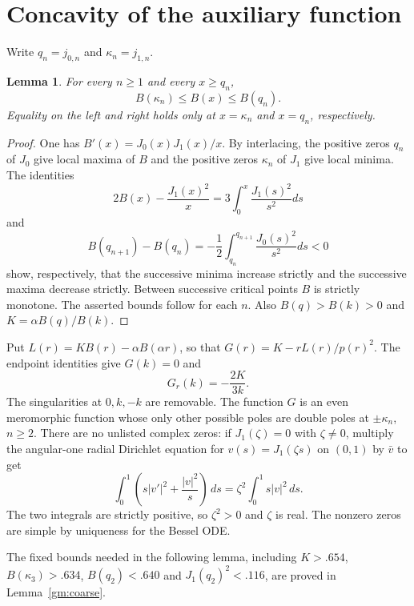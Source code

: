 \documentclass[11pt,letterpaper,reqno]{amsart}
\newtheorem{lemma}[theorem]{Lemma}
\theoremstyle{definition}
\begin{document}
\section{Concavity of the auxiliary function}\label{sec:G}
Write $q_n=j_{0,n}$ and $\kappa_n=j_{1,n}$.
\begin{lemma}\label{ev:Benvelope}
For every $n\ge1$ and every $x\ge q_n$,
\[
 B(\kappa_n)\le B(x)\le B(q_n).
\]
Equality on the left and right holds only at $x=\kappa_n$ and $x=q_n$,
respectively.
\end{lemma}
\begin{proof}
One has $B'(x)=J_0(x)J_1(x)/x$. By interlacing, the positive zeros
$q_n$ of $J_0$ give local maxima of $B$ and the positive zeros $\kappa_n$
of $J_1$ give local minima. The identities
\[
 2B(x)-\frac{J_1(x)^2}{x}
       =3\int_0^x\frac{J_1(s)^2}{s^2}ds
\]
and
\[
 B(q_{n+1})-B(q_n)
   =-\frac12\int_{q_n}^{q_{n+1}}\frac{J_0(s)^2}{s^2}ds<0
\]
show, respectively, that the successive minima increase strictly and
the successive maxima decrease strictly. Between successive critical
points $B$ is strictly monotone. The asserted bounds follow for each $n$. Also $B(q)>B(k)>0$ and
$K=\alpha B(q)/B(k)$.
\end{proof}

Put $L(r)=KB(r)-\alpha B(\alpha r)$, so that
$G(r)=K-rL(r)/p(r)^2$. The endpoint identities give $G(k)=0$ and
\begin{equation}\label{gm:endslope}
 G_r(k)=-\frac{2K}{3k}.
\end{equation}
The singularities at $0,k,-k$ are removable. The function $G$ is an
even meromorphic function whose only other possible poles are double
poles at $\pm\kappa_n$, $n\ge2$. There are no unlisted complex zeros:
if $J_1(\zeta)=0$ with $\zeta\ne0$, multiply the angular-one radial
Dirichlet equation for $v(s)=J_1(\zeta s)$ on $(0,1)$ by $\bar v$ to get
\[
 \int_0^1\left(s|v'|^2+\frac{|v|^2}s\right)\,ds
 =\zeta^2\int_0^1s|v|^2\,ds.
\]
The two integrals are strictly positive, so $\zeta^2>0$ and
$\zeta$ is real. The nonzero
zeros are simple by uniqueness for the Bessel ODE.

The fixed bounds needed in the following lemma, including
$K>.654$, $B(\kappa_3)>.634$, $B(q_2)<.640$ and
$J_1(q_2)^2<.116$, are proved in Lemma~\ref{gm:coarse}.
\end{document}

